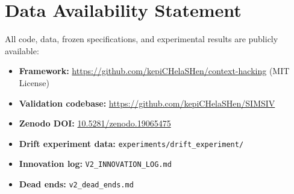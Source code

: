 \documentclass[11pt,a4paper]{article}
\begin{document}
\section*{Data Availability Statement}

All code, data, frozen specifications, and experimental results are publicly available:
\begin{itemize}[leftmargin=*]
\item \textbf{Framework:} \url{https://github.com/kepiCHelaSHen/context-hacking} (MIT License)
\item \textbf{Validation codebase:} \url{https://github.com/kepiCHelaSHen/SIMSIV}
\item \textbf{Zenodo DOI:} \href{https://doi.org/10.5281/zenodo.19065475}{10.5281/zenodo.19065475}
\item \textbf{Drift experiment data:} \texttt{experiments/drift\_experiment/}
\item \textbf{Innovation log:} \texttt{V2\_INNOVATION\_LOG.md}
\item \textbf{Dead ends:} \texttt{v2\_dead\_ends.md}
\end{itemize}
\end{document}
